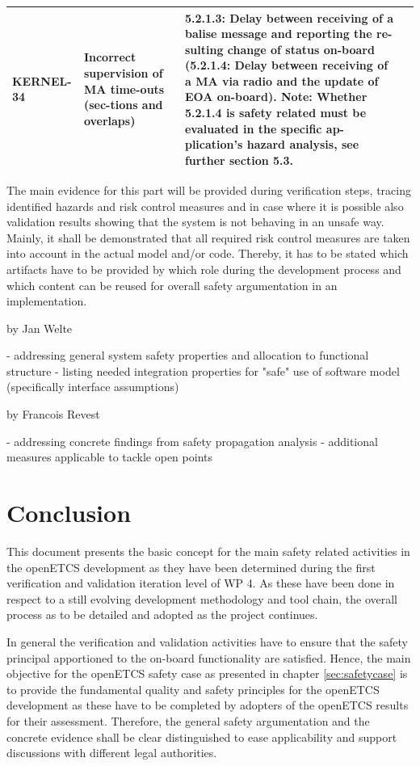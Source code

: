 \documentclass{template/openetcs_report}
\begin{document}
\begin{center}
\begin{supertabular}[H]{|p{2cm}|p{4cm}|p{4cm}|p{4cm}|}
\hline KERNEL-34 & Incorrect supervision of MA time-outs (sec-tions and overlaps) & 
5.2.1.3: Delay between receiving of a balise message and reporting the re-sulting change of status on-board
(5.2.1.4: Delay between receiving of a MA via radio and the update of EOA on-board).
Note: Whether 5.2.1.4 is safety related must be evaluated in the specific ap-plication’s hazard analysis, see further section 5.3.  &  \\
\hline 
\end{supertabular} 
\end{center}

The main evidence for this part will be provided during verification steps, tracing identified hazards and risk control measures and in case where it is possible also validation results showing that the system is not behaving in an unsafe way. Mainly, it shall be demonstrated that all required risk control measures are taken into account in the actual model and/or code. Thereby, it has to be stated which artifacts have to be provided by which role during the development process and which content can be reused for overall safety argumentation in an implementation.

by Jan Welte

- addressing general system safety properties and allocation to functional structure
- listing needed integration properties for "safe" use of software model (specifically interface assumptions)

by Francois Revest

- addressing concrete findings from safety propagation analysis
- additional measures applicable to tackle open points


\chapter{Conclusion}
\label{sec:conclusion}

This document presents the basic concept for the main safety related activities in the openETCS development as they have been determined during the first verification and validation iteration level of WP 4. As these have been done in respect to a still evolving development methodology and tool chain, the overall process as to be detailed and adopted as the project continues. 

In general the verification and validation activities have to ensure that the safety principal apportioned to the on-board functionality are satisfied. Hence, the main objective for the openETCS safety case as presented in chapter \ref{sec:safetycase} is to provide the fundamental quality and safety principles for the openETCS development as these have to be completed by adopters of the openETCS results for their assessment. Therefore, the general safety argumentation and the concrete evidence shall be clear distinguished to ease applicability and support discussions with different legal authorities.
\end{document}
